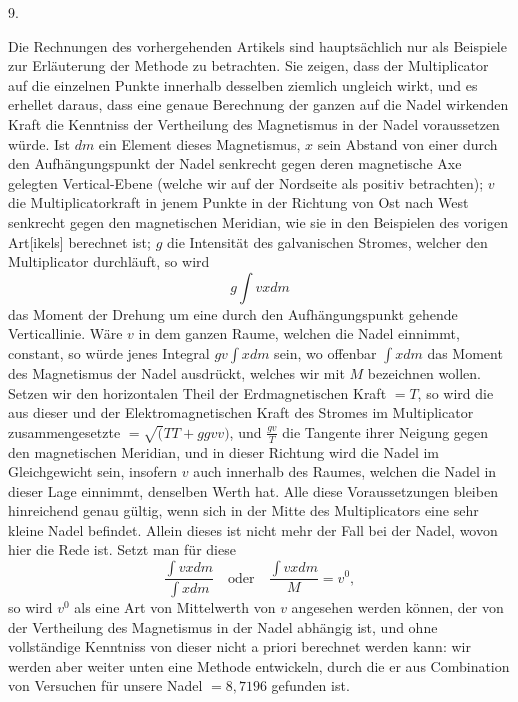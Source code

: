 \clearpage\begingroup
{}
\begin{center}9.\end{center}
\noindent\hspace*{\parindent}Die Rechnungen des vorhergehenden Artikels sind hauptsächlich nur als Beispiele zur Erläuterung der Methode zu betrachten. Sie zeigen, dass der
\clearpage{}
\noindent Multiplicator auf die einzelnen Punkte innerhalb desselben ziemlich ungleich wirkt, und es erhellet daraus, dass eine genaue Berechnung der ganzen auf die Nadel wirkenden Kraft die Kenntniss der Vertheilung des Magnetismus in der Nadel voraussetzen würde. Ist $dm$ ein Element dieses Magnetismus, $x$ sein Abstand von einer durch den Aufhängungspunkt der Nadel senkrecht gegen deren magnetische Axe gelegten Vertical-Ebene (welche wir auf der Nordseite als positiv betrachten); $v$ die Multiplicatorkraft in jenem Punkte in der Richtung von Ost nach West senkrecht gegen den magnetischen Meridian, wie sie in den Beispielen des vorigen Art[ikels] berechnet ist; $g$ die Intensität des galvanischen Stromes, welcher den Multiplicator durchläuft, so wird
\[
g\int vxdm
\]
\noindent das Moment der Drehung um eine durch den Aufhängungspunkt gehende Verticallinie. Wäre $v$ in dem ganzen Raume, welchen die Nadel einnimmt, constant, so würde jenes Integral $gv\int xdm$ sein, wo offenbar $\int xdm$ das Moment des Magnetismus der Nadel ausdrückt, welches wir mit $M$ bezeichnen wollen. Setzen wir den horizontalen Theil der Erdmagnetischen Kraft $=T$, so wird die aus dieser und der Elektromagnetischen Kraft des Stromes im Multiplicator zusammengesetzte $=\surd(TT+ggvv)$, und $\frac{gv}{T}$ die Tangente ihrer Neigung gegen den magnetischen Meridian, und in dieser Richtung wird die Nadel im Gleichgewicht sein, insofern $v$ auch innerhalb des Raumes, welchen die Nadel in dieser Lage einnimmt, denselben Werth hat. Alle diese Voraussetzungen bleiben hinreichend genau gültig, wenn sich in der Mitte des Multiplicators eine sehr kleine Nadel befindet. Allein dieses ist nicht mehr der Fall bei der Nadel, wovon hier die Rede ist. Setzt man für diese
\[
\frac{\int vxdm}{\int xdm}\quad\text{oder}\quad\frac{\int vxdm}{M}=v^0,
\]
\noindent so wird $v^0$ als eine Art von Mittelwerth von $v$ angesehen werden können, der von der Vertheilung des Magnetismus in der Nadel abhängig ist, und ohne vollständige Kenntniss von dieser nicht a priori berechnet werden kann: wir werden aber weiter unten eine Methode entwickeln, durch die er aus Combination von Versuchen für unsere Nadel $=8{,}7196$ gefunden ist.

